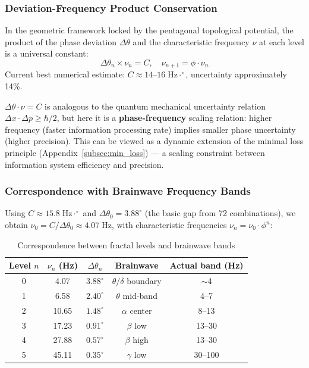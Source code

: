 \subsubsection{Deviation-Frequency Product Conservation}

\begin{conjecture}
\label{conj:product_conservation_en}
In the geometric framework locked by the pentagonal topological potential, the product of the phase deviation $\Delta\theta$ and the characteristic frequency $\nu$ at each level is a universal constant:
\begin{equation}
\Delta\theta_n \times \nu_n = C, \quad \nu_{n+1} = \phi \cdot \nu_n
\label{eq:product_conservation_en}
\end{equation}
Current best numerical estimate: $C \approx 14$--$16\;\text{Hz}\cdot^\circ$, uncertainty approximately 14\%.
\end{conjecture}

\begin{remark}
$\Delta\theta \cdot \nu = C$ is analogous to the quantum mechanical uncertainty relation $\Delta x \cdot \Delta p \geq \hbar/2$, but here it is a \textbf{phase-frequency} scaling relation: higher frequency (faster information processing rate) implies smaller phase uncertainty (higher precision). This can be viewed as a dynamic extension of the minimal loss principle (Appendix~\ref{subsec:min_loss}) --- a scaling constraint between information system efficiency and precision.
\end{remark}

\subsubsection{Correspondence with Brainwave Frequency Bands}

Using $C \approx 15.8\;\text{Hz}\cdot^\circ$ and $\Delta\theta_0 = 3.88^\circ$ (the basic gap from 72 combinations), we obtain $\nu_0 = C/\Delta\theta_0 \approx 4.07\;\text{Hz}$, with characteristic frequencies $\nu_n = \nu_0 \cdot \phi^n$:

\begin{table}[htbp]
\centering
\caption{Correspondence between fractal levels and brainwave bands}
\label{tab:brain_waves_en}
\begin{tabular}{ccccc}
\hline
Level $n$ & $\nu_n$ (Hz) & $\Delta\theta_n$ & Brainwave & Actual band (Hz) \\
\hline
0 & 4.07 & $3.88^\circ$ & $\theta/\delta$ boundary & $\sim$4 \\
1 & 6.58 & $2.40^\circ$ & $\theta$ mid-band & 4--7 \\
2 & 10.65 & $1.48^\circ$ & $\alpha$ center & 8--13 \\
3 & 17.23 & $0.91^\circ$ & $\beta$ low & 13--30 \\
4 & 27.88 & $0.57^\circ$ & $\beta$ high & 13--30 \\
5 & 45.11 & $0.35^\circ$ & $\gamma$ low & 30--100 \\
\hline
\end{tabular}
\end{table}

